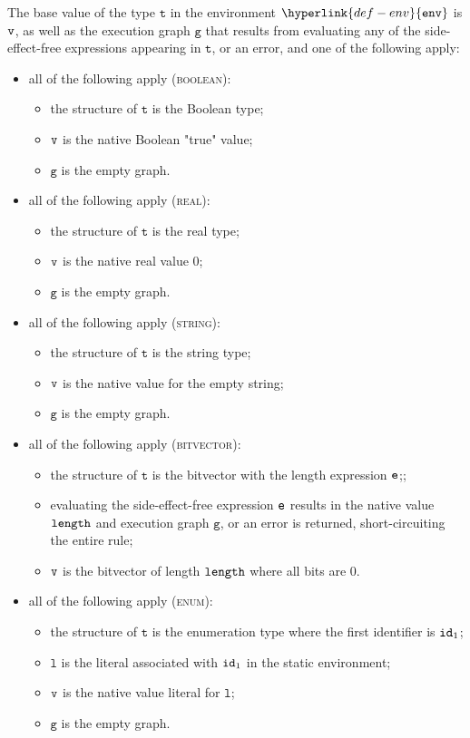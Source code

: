 \documentclass{book}
\newcommand\env[0]{\hyperlink{def-env}{\texttt{env}}}
\newcommand\vg[0]{\texttt{g}}
\newcommand\vl[0]{\texttt{l}}
\newcommand\vt[0]{\texttt{t}}
\begin{document}
The base value of the type $\vt$ in the environment $\env$ is $\texttt{v}$,
as well as the execution graph $\vg$ that results
from evaluating any of the side-effect-free expressions appearing in $\vt$,
or an error, and one of the following apply:
\begin{itemize}
  \item all of the following apply (\textsc{boolean}):
  \begin{itemize}
    \item the structure of $\vt$ is the Boolean type;
    \item $\texttt{v}$ is the native Boolean "true" value;
    \item $\vg$ is the empty graph.
  \end{itemize}

  \item all of the following apply (\textsc{real}):
  \begin{itemize}
    \item the structure of $\vt$ is the real type;
    \item $\texttt{v}$ is the native real value $0$;
    \item $\vg$ is the empty graph.
  \end{itemize}

  \item all of the following apply (\textsc{string}):
  \begin{itemize}
    \item the structure of $\vt$ is the string type;
    \item $\texttt{v}$ is the native value for the empty string;
    \item $\vg$ is the empty graph.
  \end{itemize}

  \item all of the following apply (\textsc{bitvector}):
  \begin{itemize}
    \item the structure of $\vt$ is the bitvector with the length expression $\texttt{e}$;;
    \item evaluating the side-effect-free expression $\texttt{e}$ results in the native value $\texttt{length}$
    and execution graph $\vg$,
    or an error is returned, short-circuiting the entire rule;
    \item $\texttt{v}$ is the bitvector of length $\texttt{length}$ where all bits are $0$.
  \end{itemize}

  \item all of the following apply (\textsc{enum}):
  \begin{itemize}
    \item the structure of $\vt$ is the enumeration type where the first identifier is $\texttt{id}_1$;
    \item $\vl$ is the literal associated with $\texttt{id}_1$ in the static environment;
    \item $\texttt{v}$ is the native value literal for $\vl$;
    \item $\vg$ is the empty graph.
  \end{itemize}


\end{itemize}
\end{document}
